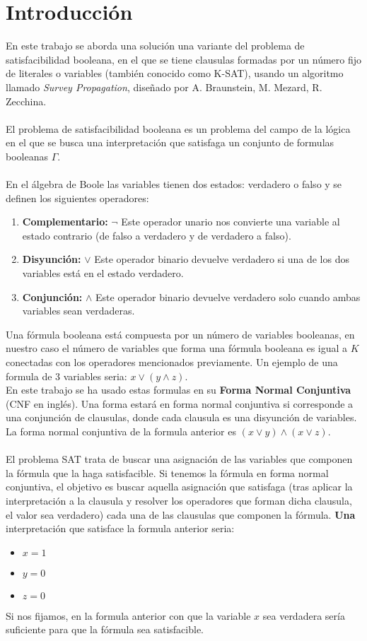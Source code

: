 \section{Introducción}
En este trabajo se aborda una solución una variante del problema de satisfacibilidad booleana, en el que se tiene clausulas formadas por un número fijo de literales o variables (también conocido como K-SAT), usando un algoritmo llamado \textit{Survey Propagation}, diseñado por A. Braunstein, M. Mezard, R. Zecchina. \\\\
El problema de satisfacibilidad booleana es un problema del campo de la lógica en el que se busca una interpretación que satisfaga un conjunto de formulas booleanas $\Gamma$.\\\\
En el álgebra de Boole las variables tienen dos estados: verdadero o falso y se definen los siguientes operadores:
\begin{enumerate}[1.]
	\item \textbf{Complementario:} $\neg$ Este operador unario nos convierte una variable al estado contrario (de falso a verdadero y de verdadero a falso).
	\item \textbf{Disyunción:} $\lor$ Este operador binario devuelve verdadero si una de los dos variables está en el estado verdadero.
	\item \textbf{Conjunción:} $\land$ Este operador binario devuelve verdadero solo cuando ambas variables sean verdaderas.
\end{enumerate}
Una fórmula booleana está compuesta por un número de variables booleanas, en nuestro caso el número de variables que forma una fórmula booleana es igual a $K$ conectadas con los operadores mencionados previamente. Un ejemplo de una formula de 3 variables seria: $x \lor (y \land z)$.\\
En este trabajo se ha usado estas formulas en su \textbf{Forma Normal Conjuntiva} (CNF en inglés).
Una forma estará en forma normal conjuntiva si corresponde a una conjunción de clausulas, donde cada clausula es una disyunción de variables. La forma normal conjuntiva de la formula anterior es $(x \lor y)\land (x \lor z)$.\\\\
El problema SAT trata de buscar una asignación de las variables que componen la fórmula que la haga satisfacible.
Si tenemos la fórmula en forma normal conjuntiva, el objetivo es buscar aquella asignación que satisfaga (tras aplicar la interpretación a la clausula y resolver los operadores que forman dicha clausula, el valor sea verdadero) cada una de las clausulas que componen la fórmula. \textbf{Una} interpretación que satisface la formula anterior seria:
\begin{itemize}
	\item $x=1$
	\item $y=0$
	\item $z=0$
\end{itemize}
Si nos fijamos, en la formula anterior con que la variable $x$ sea verdadera sería suficiente para que la fórmula sea satisfacible.\\\\

